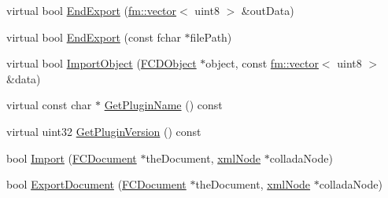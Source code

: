 \begin{DoxyCompactItemize}
\item 
virtual bool \hyperlink{classFArchiveXML_a877083fc6c055f24042dd50103fb00a4}{EndExport} (\hyperlink{classfm_1_1vector}{fm::vector}$<$ uint8 $>$ \&outData)
\item 
virtual bool \hyperlink{classFArchiveXML_a19693477bc5410a640105cec37febdb6}{EndExport} (const fchar $\ast$filePath)
\item 
virtual bool \hyperlink{classFArchiveXML_a323f1807851e536b1c46f7583303518e}{ImportObject} (\hyperlink{classFCDObject}{FCDObject} $\ast$object, const \hyperlink{classfm_1_1vector}{fm::vector}$<$ uint8 $>$ \&data)
\item 
virtual const char $\ast$ \hyperlink{classFArchiveXML_abd9ac092eff78dbc8f8249fa402fe644}{GetPluginName} () const 
\item 
virtual uint32 \hyperlink{classFArchiveXML_a2fb1d4d2d6d862e023d8510ea404bd60}{GetPluginVersion} () const 
\item 
bool \hyperlink{classFArchiveXML_a31a7807261de79f1f8b9e539e7dff0ea}{Import} (\hyperlink{classFCDocument}{FCDocument} $\ast$theDocument, \hyperlink{struct__xmlNode}{xmlNode} $\ast$colladaNode)
\item 
bool \hyperlink{classFArchiveXML_a924a76fcef59b49c82ce323badbcc469}{ExportDocument} (\hyperlink{classFCDocument}{FCDocument} $\ast$theDocument, \hyperlink{struct__xmlNode}{xmlNode} $\ast$colladaNode)
\end{DoxyCompactItemize}
